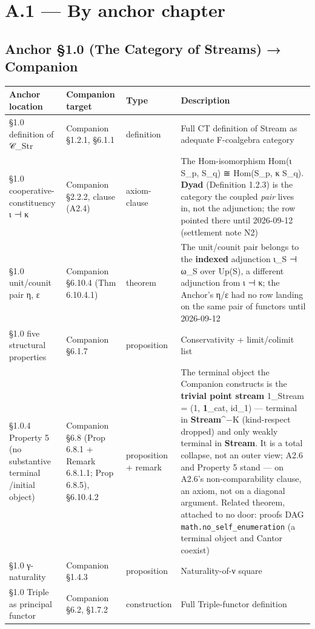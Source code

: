 \documentclass[11pt, openany]{book}
\newcommand{\sectionbreak}{\clearpage}
\begin{document}
\sectionbreak

\section{A.1 --- By anchor chapter}

\subsection{Anchor §1.0 (The Category of Streams) → Companion}

\begingroup\setlength{\tabcolsep}{3pt}\renewcommand{\arraystretch}{1.15}\footnotesize
\begin{center}
\begin{tabular}{p{0.51in} p{0.51in} p{0.51in} p{2.75in}}
\toprule
Anchor location & Companion target & Type & Description \\
\midrule
§1.0 definition of 𝒞\_\allowbreak{}Str & Companion §1.2.1, §6.1.1 & definition & Full CT definition of Stream as adequate F-coalgebra category \\
§1.0 cooperative-constituency ι ⊣ κ & Companion §2.2.2, clause (A2.4) & axiom-clause & The Hom-isomorphism Hom(ι S\_\allowbreak{}p, S\_\allowbreak{}q) ≅ Hom(S\_\allowbreak{}p, κ S\_\allowbreak{}q). \textbf{Dyad} (Definition 1.2.3) is the category the coupled \textit{pair} lives in, not the adjunction; the row pointed there until 2026-09-12 (settlement note N2) \\
§1.0 unit/\allowbreak counit pair η, ε & Companion §6.10.4 (Thm 6.10.4.1) & theorem & The unit/\allowbreak counit pair belongs to the \textbf{indexed} adjunction ι\_\allowbreak{}S ⊣ ω\_\allowbreak{}S over Up(S), a different adjunction from ι ⊣ κ; the Anchor's η/\allowbreak ε had no row landing on the same pair of functors until 2026-09-12 \\
§1.0 five structural properties & Companion §6.1.7 & proposition & Conservativity + limit/\allowbreak colimit list \\
§1.0.4 Property 5 (no substantive terminal /\allowbreak  initial object) & Companion §6.8 (Prop 6.8.1 + Remark 6.8.1.1; Prop 6.8.5), §6.10.4.2 & proposition + remark & The terminal object the Companion constructs is the \textbf{trivial point stream} 1\_\allowbreak{}Stream = (1, \textbf{1}\_\allowbreak{}cat, id\_\allowbreak{}1) --- terminal in \textbf{Stream}\textasciicircum{}{−K} (kind-respect dropped) and only weakly terminal in \textbf{Stream}. It is a total collapse, not an outer view; A2.6 and Property 5 stand --- on A2.6's non-comparability clause, an axiom, not on a diagonal argument. Related theorem, attached to no door: proofs DAG \texttt{math.no\_self\_enumeration} (a terminal object and Cantor coexist) \\
§1.0 γ-naturality & Companion §1.4.3 & proposition & Naturality-of-ν square \\
§1.0 Triple as principal functor & Companion §6.2, §1.7.2 & construction & Full Triple-functor definition \\
\bottomrule
\end{tabular}
\end{center}
\endgroup
\end{document}

